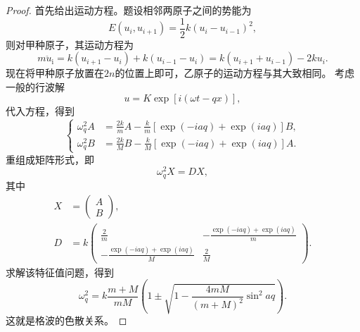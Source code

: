 \begin{proof}
    首先给出运动方程。题设相邻两原子之间的势能为
    \begin{equation}
        E(u_i, u_{i+1}) = \frac{1}{2} k (u_i - u_{i-1})^2,
    \end{equation}
    则对甲种原子，其运动方程为
    \begin{equation}
        m \ddot u_\text{i} = k(u_{i+1} - u_i) + k(u_{i-1} - u_i) = k(u_{i+1} + u_{i-1}) - 2ku_i.
    \end{equation}
    现在将甲种原子放置在$2n$的位置上即可，乙原子的运动方程与其大致相同。
    考虑一般的行波解
    \begin{equation}
        u = K \exp[i(\omega t - qx)],
    \end{equation}
    代入方程，得到
    \begin{equation}
        \left\{
        \begin{aligned}
            \omega_q^2 A &= \frac{2k}{m} A - \frac{k}{m}[\exp(-iaq) + \exp(i aq)] B, \\
            \omega_q^2 B &= \frac{2k}{M} B - \frac{k}{M}[\exp(-i aq) + \exp(i aq)] A.
        \end{aligned}
        \right.
    \end{equation}
    重组成矩阵形式，即
    \begin{equation}
        \omega_q^2 X = D X,
    \end{equation}
    其中
    \begin{equation}
        \begin{aligned}
            X &= \begin{pmatrix}
                A \\ B
            \end{pmatrix}, \\
            D &= k \begin{pmatrix}
                \frac{2}{m} & - \frac{\exp(-iaq) + \exp(iaq)}{m} \\
                - \frac{\exp(-i aq) + \exp(iaq)}{M} & \frac{2}{M}
            \end{pmatrix}.
        \end{aligned}
    \end{equation}
    求解该特征值问题，得到
    \begin{equation}
        \omega_q^2 = k \frac{m+M}{mM} \left( 1 \pm \sqrt{1 - \frac{4mM}{(m+M)^2} \sin^2 aq} \right).
    \end{equation}
    这就是格波的色散关系。
\end{proof}

